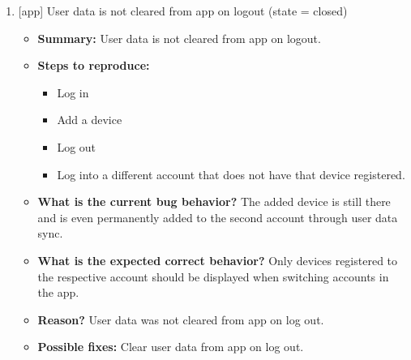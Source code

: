 \begin{enumerate}
\item {[app] User data is not cleared from app on logout (state = closed)}
\begin{itemize}	
	\item \textbf{Summary: }User data is not cleared from app on logout.\\
	\item \textbf{Steps to reproduce: }
	\begin{itemize}
		\item Log in\\
		\item Add a device\\
		\item Log out\\
		\item Log into a different account that does not have that device registered.\\
	\end{itemize}
	\item \textbf{What is the current bug behavior? }The added device is still there and is even permanently added to the second account through user data sync.\\
	\item \textbf{What is the expected correct behavior? }Only devices registered to the respective account should be displayed when switching accounts in the app.\\
	\item \textbf{Reason? }User data was not cleared from app on log out.\\
	\item \textbf{Possible fixes: }Clear user data from app on log out.\\
\end{itemize}




\end{enumerate}
